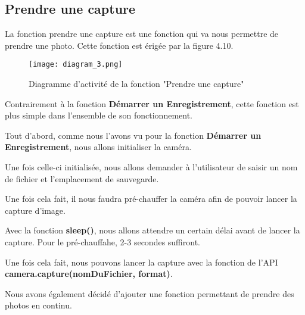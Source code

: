         \subsection{Prendre une capture}
        La fonction prendre une capture est une fonction qui va nous permettre de prendre une photo.
        Cette fonction est érigée par la figure 4.10.
        \begin{figure}[ht]
            \centering
            \texttt{[image: diagram\_3.png]} 
            \caption{Diagramme d'activité de la fonction "Prendre une capture"}
        \end{figure}


        \begin{flushleft}
            Contrairement à la fonction \textbf{Démarrer un Enregistrement}, cette fonction est plus simple dans l'ensemble de son fonctionnement.

            \vspace{0.2cm}

            Tout d'abord, comme nous l'avons vu pour la fonction \textbf{Démarrer un Enregistrement}, nous allons initialiser la caméra.

            \vspace{0.2cm}
    
            Une fois celle-ci initialisée, nous allons demander à l'utilisateur de saisir un nom de fichier et l'emplacement de sauvegarde.

            \vspace{0.2cm}
    
            Une fois cela fait, il nous faudra pré-chauffer la caméra afin de pouvoir lancer la capture d'image.
            
            \vspace{0.2cm}
    
            Avec la fonction \textbf{sleep()}, nous allons attendre un certain délai avant de lancer la capture.
            Pour le pré-chauffahe, 2-3 secondes suffiront.

            \vspace{0.2cm}
    
            Une fois cela fait, nous pouvons lancer la capture avec la fonction de l'API \textbf{camera.capture(nomDuFichier, format)}.
            
            \vspace{0.2cm}

            Nous avons également décidé d'ajouter une fonction permettant de prendre des photos en continu.


\end{flushleft}
